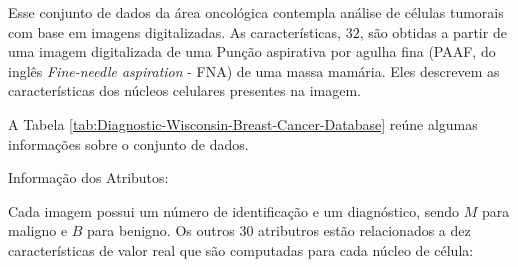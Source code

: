 Esse conjunto de dados da área oncológica contempla análise de células tumorais com base em imagens digitalizadas. As características, $32$, são obtidas a partir de uma imagem digitalizada de uma Punção aspirativa por agulha fina (PAAF, do inglês \textit{Fine-needle aspiration} - FNA) de uma massa mamária. Eles descrevem as características dos núcleos celulares presentes na imagem.


A Tabela \ref{tab:Diagnostic-Wisconsin-Breast-Cancer-Database} reúne algumas informações sobre o conjunto de dados.



    

Informação dos Atributos:

Cada imagem possui um número de identificação e um diagnóstico, sendo $M$ para maligno e $B$ para benigno. Os outros $30$ atributros estão relacionados a dez características de valor real que são computadas para cada núcleo de célula:

